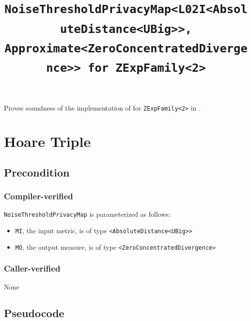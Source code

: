 \documentclass{article}
\title{\texttt{NoiseThresholdPrivacyMap<L02I<AbsoluteDistance<UBig>>, Approximate<ZeroConcentratedDivergence>> for ZExpFamily<2>}}
\author{\MichaelShoemateAuthor}
\date{}
\begin{document}
\maketitle

\contrib
Proves soundness of the implementation of  for \texttt{ZExpFamily<2>} in .

\section{Hoare Triple}
\subsection*{Precondition}
\subsubsection*{Compiler-verified}
\texttt{NoiseThresholdPrivacyMap} is parameterized as follows:
\begin{itemize}
    \item \texttt{MI}, the input metric, is of type \texttt{<AbsoluteDistance<UBig>>}
    \item \texttt{MO}, the output measure, is of type \texttt{<ZeroConcentratedDivergence>}
\end{itemize}

\subsubsection*{Caller-verified}
None

\subsection*{Pseudocode}

\end{document}
